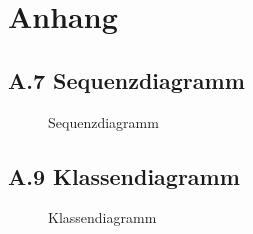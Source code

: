 \section{Anhang}
\clearpage
\setcounter{page}{6}
\subsection*{A.7 Sequenzdiagramm}
\label{app:Sequenz}
\begin{figure}[!htb]
    \centering
    \caption{Sequenzdiagramm}
\end{figure}
\clearpage

\setcounter{page}{8}
\subsection*{A.9 Klassendiagramm}
\label{app:Klassendiagramm}
\begin{figure}[!htb]
\centering
{}
\caption{Klassendiagramm}
\end{figure}

